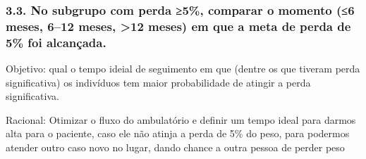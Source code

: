 \documentclass[
]{article}
\begin{document}
\subsubsection{3.3. No subgrupo com perda ≥5\%, comparar o momento (≤6
meses, 6--12 meses, \textgreater12 meses) em que a meta de perda de 5\%
foi
alcançada.}\label{no-subgrupo-com-perda-5-comparar-o-momento-6-meses-612-meses-12-meses-em-que-a-meta-de-perda-de-5-foi-alcanuxe7ada.}

Objetivo: qual o tempo ideial de seguimento em que (dentre os que
tiveram perda significativa) os indivíduos tem maior probabilidade de
atingir a perda significativa.

Racional: Otimizar o fluxo do ambulatório e definir um tempo ideal para
darmos alta para o paciente, caso ele não atinja a perda de 5\% do peso,
para podermos atender outro caso novo no lugar, dando chance a outra
pessoa de perder peso
\end{document}
